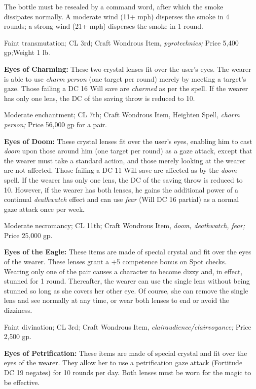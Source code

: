The bottle must be resealed by a command word, after which the smoke dissipates 
normally. A moderate wind (11+ mph) disperses the smoke in 4 rounds; a strong wind 
(21+ mph) disperses the smoke in 1 round.

Faint transmutation; CL 3rd; Craft Wondrous Item, \textit{pyrotechnics; }Price 
5,400 gp;Weight 1 lb.

\textbf{Eyes of Charming: }These two crystal lenses fit over the user's eyes. The 
wearer is able to use \textit{charm person }(one target per round) merely by meeting 
a target's gaze. Those failing a DC 16 Will save are \textit{charmed }as per the 
spell. If the wearer has only one lens, the DC of the saving throw is reduced to 
10.

Moderate enchantment; CL 7th; Craft Wondrous Item, Heighten Spell, \textit{charm 
person; }Price 56,000 gp for a pair.

\textbf{Eyes of Doom:} These crystal lenses fit over the user's eyes, enabling 
him to cast \textit{doom }upon those around him (one target per round) as a gaze 
attack, except that the wearer must take a standard action, and those merely looking 
at the wearer are not affected. Those failing a DC 11 Will save are affected as 
by the \textit{doom }spell. If the wearer has only one lens, the DC of the saving 
throw is reduced to 10. However, if the wearer has both lenses, he gains the additional 
power of a continual \textit{deathwatch }effect and can use \textit{fear }(Will 
DC 16 partial) as a normal gaze attack once per week.

Moderate necromancy; CL 11th; Craft Wondrous Item, \textit{doom, deathwatch, fear; 
}Price 25,000 gp.

\textbf{Eyes of the Eagle:} These items are made of special crystal and fit over 
the eyes of the wearer. These lenses grant a +5 competence bonus on Spot checks. 
Wearing only one of the pair causes a character to become dizzy and, in effect, 
stunned for 1 round. Thereafter, the wearer can use the single lens without being 
stunned so long as she covers her other eye. Of course, she can remove the single 
lens and see normally at any time, or wear both lenses to end or avoid the dizziness.

Faint divination; CL 3rd; Craft Wondrous Item, \textit{clairaudience/clairvoyance; 
}Price 2,500 gp.

\textbf{Eyes of Petrification: }These items are made of special crystal and fit 
over the eyes of the wearer. They allow her to use a petrification gaze attack 
(Fortitude DC 19 negates) for 10 rounds per day. Both lenses must be worn for the 
magic to be effective.

